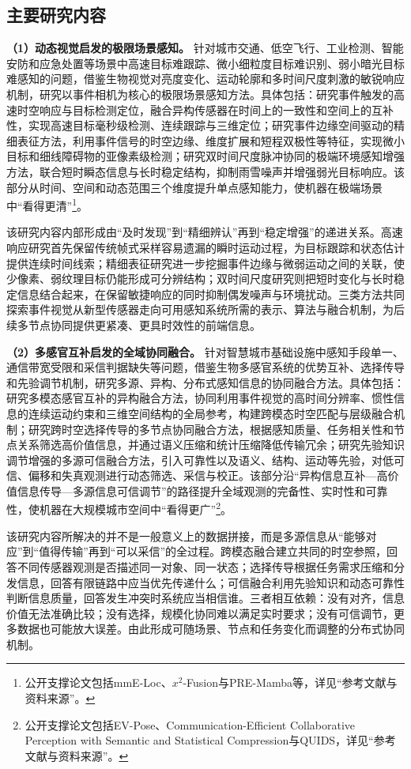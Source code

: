 \subsection{主要研究内容}

\textbf{（1）动态视觉启发的极限场景感知。}
针对城市交通、低空飞行、工业检测、智能安防和应急处置等场景中高速目标难跟踪、微小细粒度目标难识别、弱小暗光目标难感知的问题，借鉴生物视觉对亮度变化、运动轮廓和多时间尺度刺激的敏锐响应机制，研究以事件相机为核心的极限场景感知方法。具体包括：研究事件触发的高速时空响应与目标检测定位，融合异构传感器在时间上的一致性和空间上的互补性，实现高速目标毫秒级检测、连续跟踪与三维定位；研究事件边缘空间驱动的精细表征方法，利用事件信号的时空边缘、维度扩展和短程双极性等特征，实现微小目标和细线障碍物的亚像素级检测；研究双时间尺度脉冲协同的极端环境感知增强方法，联合短时瞬态信息与长时稳定结构，抑制雨雪噪声并增强弱光目标响应。该部分从时间、空间和动态范围三个维度提升单点感知能力，使机器在极端场景中“看得更清”\footnote{公开支撑论文包括mmE-Loc、$x^2$-Fusion与PRE-Mamba等，详见“参考文献与资料来源”。}。

该研究内容内部形成由“及时发现”到“精细辨认”再到“稳定增强”的递进关系。高速响应研究首先保留传统帧式采样容易遗漏的瞬时运动过程，为目标跟踪和状态估计提供连续时间线索；精细表征研究进一步挖掘事件边缘与微弱运动之间的关联，使少像素、弱纹理目标仍能形成可分辨结构；双时间尺度研究则把短时变化与长时稳定信息结合起来，在保留敏捷响应的同时抑制偶发噪声与环境扰动。三类方法共同探索事件视觉从新型传感器走向可用感知系统所需的表示、算法与融合机制，为后续多节点协同提供更紧凑、更具时效性的前端信息。

\textbf{（2）多感官互补启发的全域协同融合。}
针对智慧城市基础设施中感知手段单一、通信带宽受限和采信判据缺失等问题，借鉴生物多感官系统的优势互补、选择传导和先验调节机制，研究多源、异构、分布式感知信息的协同融合方法。具体包括：研究多模态感官互补的异构融合方法，协同利用事件视觉的高时间分辨率、惯性信息的连续运动约束和三维空间结构的全局参考，构建跨模态时空匹配与层级融合机制；研究跨时空选择传导的多节点协同融合方法，根据感知质量、任务相关性和节点关系筛选高价值信息，并通过语义压缩和统计压缩降低传输冗余；研究先验知识调节增强的多源可信融合方法，引入可靠性以及语义、结构、运动等先验，对低可信、偏移和失真观测进行动态筛选、采信与校正。该部分沿“异构信息互补---高价值信息传导---多源信息可信调节”的路径提升全域观测的完备性、实时性和可靠性，使机器在大规模城市空间中“看得更广”\footnote{公开支撑论文包括EV-Pose、Communication-Efficient Collaborative Perception with Semantic and Statistical Compression与QUIDS，详见“参考文献与资料来源”。}。

该研究内容所解决的并不是一般意义上的数据拼接，而是多源信息从“能够对应”到“值得传输”再到“可以采信”的全过程。跨模态融合建立共同的时空参照，回答不同传感器观测是否描述同一对象、同一状态；选择传导根据任务需求压缩和分发信息，回答有限链路中应当优先传递什么；可信融合利用先验知识和动态可靠性判断信息质量，回答发生冲突时系统应当相信谁。三者相互依赖：没有对齐，信息价值无法准确比较；没有选择，规模化协同难以满足实时要求；没有可信调节，更多数据也可能放大误差。由此形成可随场景、节点和任务变化而调整的分布式协同机制。

